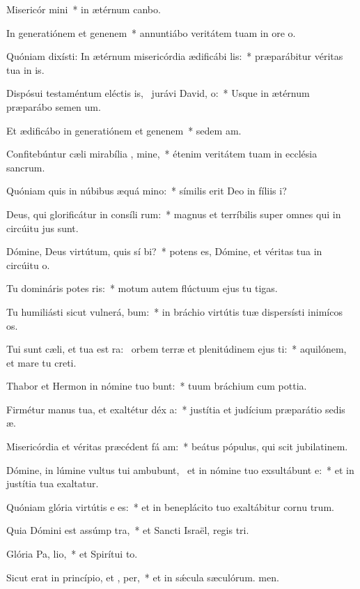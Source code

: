 \item Misericór mini~* in ætérnum canbo.
\item In generatiónem et genenem~* annuntiábo veritátem tuam in ore o.
\item Quóniam dixísti: In ætérnum misericórdia ædificábi  lis:~* præparábitur véritas tua in is.
\item Dispósui testaméntum eléctis is,~\pscross{} jurávi David,  o:~* Usque in ætérnum præparábo semen um.
\item Et ædificábo in generatiónem et genenem~* sedem am.
\item Confitebúntur cæli mirabília , mine,~* étenim veritátem tuam in ecclésia sancrum.
\item Quóniam quis in núbibus æquá mino:~* símilis erit Deo in fíliis i?
\item Deus, qui glorificátur in consíli rum:~* magnus et terríbilis super omnes qui in circúitu jus sunt.
\item Dómine, Deus virtútum, quis sí bi?~* potens es, Dómine, et véritas tua in circúitu o.
\item Tu domináris potes ris:~* motum autem flúctuum ejus tu tigas.
\item Tu humiliásti sicut vulnerá, bum:~* in bráchio virtútis tuæ dispersísti inimícos os.
\item Tui sunt cæli, et tua est ra:~\pscross{} orbem terræ et plenitúdinem ejus  ti:~* aquilónem, et mare tu creti.
\item Thabor et Hermon in nómine tuo bunt:~* tuum bráchium cum pottia.
\item Firmétur manus tua, et exaltétur déx a:~* justítia et judícium præparátio sedis æ.
\item Misericórdia et véritas præcédent fá am:~* beátus pópulus, qui scit jubilatinem.
\item Dómine, in lúmine vultus tui ambubunt,~\pscross{} et in nómine tuo exsultábunt  e:~* et in justítia tua exaltatur.
\item Quóniam glória virtútis e  es:~* et in beneplácito tuo exaltábitur cornu trum.
\item Quia Dómini est assúmp tra,~* et Sancti Israël, regis tri.
\item Glória Pa,  lio,~* et Spirítui to.
\item Sicut erat in princípio, et ,  per,~* et in sǽcula sæculórum. men.
